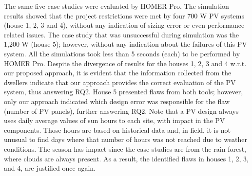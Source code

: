 \documentclass[journal]{IEEEtran}
\begin{document}
The same five case studies were evaluated by HOMER Pro. The simulation results showed that the project restrictions were met by four 700 W PV systems (house 1, 2, 3 and 4), without any indication of sizing error or even performance related issues. The case study that was unsuccessful during simulation was the 1,200 W (house 5); however, without any indication about the failures of this PV system. All the simulations took less than 5 seconds (each) to be performed by HOMER Pro.
%
Despite the divergence of results for the houses 1, 2, 3 and 4 w.r.t. our proposed approach, it is evident that the information collected from the dwellers indicate that our approach provides the correct evaluation of the PV system, thus answering RQ2. House 5 presented flaws from both tools; however, only our approach indicated which design error was responsible for the flaw (number of PV panels), further answering RQ2.
%
Note that a PV design always uses daily average values of sun hours to each site, with impact in the PV components. Those hours are based on historical data and, in field, it is not unusual to find days where that number of hours was not reached due to weather conditions. The season has impact since the case studies are from the rain forest, where clouds are always present. As a result, the identified flaws in houses 1, 2, 3, and 4, are justified once again.
%
%
\end{document}
